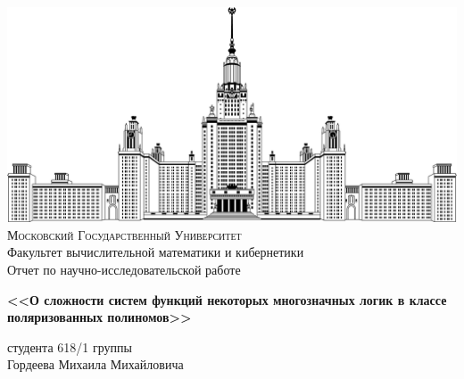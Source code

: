 \documentclass [12pt, a4paper] {extarticle}
\begin{document}
\thispagestyle {empty}

\begin {center}

    \includegraphics [width = 0.5 \textwidth] {msu.png} \\
    {\scshape Московский Государственный Университет} \\
    Факультет вычислительной математики и кибернетики\\


    \vspace {2.7cm}
    {\LARGE Отчет по научно-исследовательской работе }

    \vspace {0.5cm}
    {
        \LARGE \bfseries
        <<О сложности систем функций некоторых многозначных логик в классе
        поляризованных полиномов>> \\
    }

    \vspace {0.7cm}
    {
        \Large
        студента 618/1 группы \\
        Гордеева Михаила Михайловича \\
    }

\end {center}



\vfill

    
\end{document}
